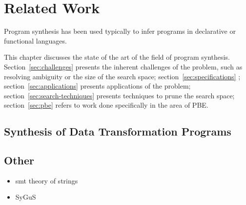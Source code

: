 \chapter{Related Work}
\label{chapter:relatedWork}



Program synthesis has been used typically to infer programs in declarative or
functional languages.

This chapter discusses the state of the art of the field of program synthesis.
Section~\ref{sec:challenges} presents the inherent challenges of the problem,
such as resolving ambiguity or the size of the search space;
section~\ref{sec:specifications} ;
section~\ref{sec:applications}
presents applications of the problem; section~\ref{sec:search-techniques}
presents techniques to prune the search space; section~\ref{sec:pbe} refers to
work done specifically in the area of \ac{PBE}.







\section{Synthesis of Data Transformation Programs}
\label{sec:data-trans-synth}


\section{Other}
\label{sec:other}

\begin{itemize}
\item smt theory of strings
\item SyGuS
\end{itemize}


